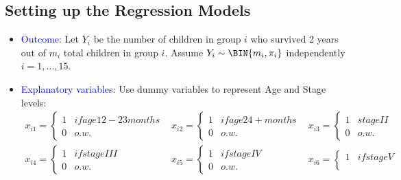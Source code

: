 \documentclass[oneside]{book}\usepackage[]{graphicx}\usepackage[svgnames]{xcolor}
\begin{document}
\subsection*{Setting up the Regression Models}
\begin{itemize}
      \item \textcolor{Blue}{Outcome}: Let $Y_i$ be the number of children in group $i$ who survived 2 years out of
            $m_i$ total children in group $i$. Assume $ Y_i \sim \BIN{m_i,\pi_i} $ independently $ i=1,\ldots,15 $.
      \item \textcolor{Blue}{Explanatory variables}: Use dummy variables to represent Age and Stage levels:
            \[ \begin{array}{lll}
                        x_{i1}  = \begin{cases*}
                                        1 & if age 12-23 months \\
                                        0 & o.w.
                                  \end{cases*} &
                        x_{i2}  = \begin{cases*}
                                        1 & if age 24+ months \\
                                        0 & o.w.
                                  \end{cases*}   &
                        x_{i3} = \begin{cases*}
                                       1 & stage II \\
                                       0 & o.w.
                                 \end{cases*}            \\
                        x_{i4}  = \begin{cases*}
                                        1 & if stage III \\
                                        0 & o.w.
                                  \end{cases*}   &
                        x_{i5}  = \begin{cases*}
                                        1 & if stage IV \\
                                        0 & o.w.
                                  \end{cases*}   &
                        x_{i6}  = \begin{cases*}
                                        1 & if stage V \\

\end{cases*}
\end{array}\]
\end{itemize}
\end{document}
